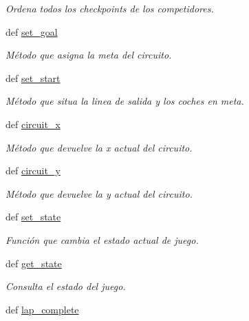 \begin{DoxyCompactItemize}
\begin{DoxyCompactList}\small\item\em \-Ordena todos los checkpoints de los competidores. \end{DoxyCompactList}\item 
def \hyperlink{classengine_1_1gamecontrol_1_1GameControl_a667acfb0f91ca114af19686cf7e9d308}{set\-\_\-goal}
\begin{DoxyCompactList}\small\item\em \-Método que asigna la meta del circuito. \end{DoxyCompactList}\item 
def \hyperlink{classengine_1_1gamecontrol_1_1GameControl_a9b51c78cc49fd614e5c81ba303e7b802}{set\-\_\-start}
\begin{DoxyCompactList}\small\item\em \-Método que situa la linea de salida y los coches en meta. \end{DoxyCompactList}\item 
def \hyperlink{classengine_1_1gamecontrol_1_1GameControl_addb048ca79e4a1fc6048ead27ec7f7fb}{circuit\-\_\-x}
\begin{DoxyCompactList}\small\item\em \-Método que devuelve la x actual del circuito. \end{DoxyCompactList}\item 
def \hyperlink{classengine_1_1gamecontrol_1_1GameControl_adb0b3dc36ac39cccf5defcd25570477b}{circuit\-\_\-y}
\begin{DoxyCompactList}\small\item\em \-Método que devuelve la y actual del circuito. \end{DoxyCompactList}\item 
def \hyperlink{classengine_1_1gamecontrol_1_1GameControl_a3c2545503a66f88f56883b69542d8a81}{set\-\_\-state}
\begin{DoxyCompactList}\small\item\em \-Función que cambia el estado actual de juego. \end{DoxyCompactList}\item 
def \hyperlink{classengine_1_1gamecontrol_1_1GameControl_aa6089a881363e34b42d2e84435f83a35}{get\-\_\-state}
\begin{DoxyCompactList}\small\item\em \-Consulta el estado del juego. \end{DoxyCompactList}\item 
\hypertarget{classengine_1_1gamecontrol_1_1GameControl_ad71a93e62a765d90514c4fe2e985c06f}{
def \hyperlink{classengine_1_1gamecontrol_1_1GameControl_ad71a93e62a765d90514c4fe2e985c06f}{lap\-\_\-complete}}
\label{classengine_1_1gamecontrol_1_1GameControl_ad71a93e62a765d90514c4fe2e985c06f}


\end{DoxyCompactItemize}

